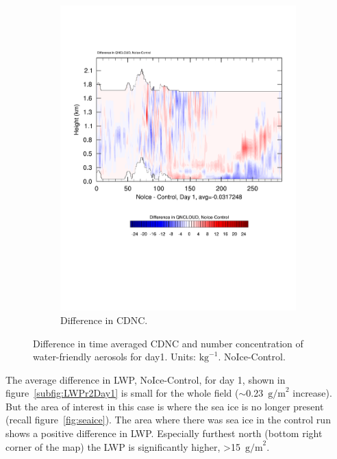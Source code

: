 \begin{figure}[ht]
\begin{subfigure}{0.48\textwidth}
		\includegraphics[width=\textwidth]{results/noice/diffSec_QNCLOUD_NoIce_Day1.pdf}
		\caption{Difference in CDNC.}
		\label{subfig:aerocrossQNCLOUD}
	\end{subfigure}
	\caption{Difference in time averaged CDNC and number concentration of water-friendly aerosols for day1. Units: $\text{kg}^{-1}$. NoIce-Control.}
	\label{fig:aeroSections}
\end{figure}

The average difference in LWP, NoIce-Control, for day 1, shown in figure~\ref{subfig:LWPr2Day1} is small for the whole field ($\sim$0.23~$\text{g/m}^2$ increase). But the area of interest in this case is where the sea ice is no longer present (recall figure~\ref{fig:seaice}). The area where there was sea ice in the control run shows a positive difference in LWP. Especially furthest north (bottom right corner of the map) the LWP is significantly higher, >15~$\text{g/m}^2$.

